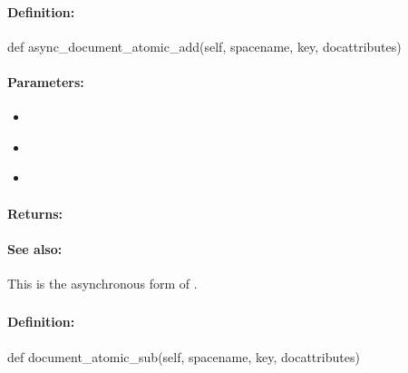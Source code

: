 \paragraph{Definition:}
\begin{pythoncode}
def async_document_atomic_add(self, spacename, key, docattributes)
\end{pythoncode}

\paragraph{Parameters:}
\begin{itemize}[noitemsep]
\item {}\\

\item {}\\

\item {}\\

\end{itemize}

\paragraph{Returns:}


\paragraph{See also:}  This is the asynchronous form of .

\pagebreak
\subsubsection{}
\label{api:python:document_atomic_sub}


\paragraph{Definition:}
\begin{pythoncode}
def document_atomic_sub(self, spacename, key, docattributes)
\end{pythoncode}

